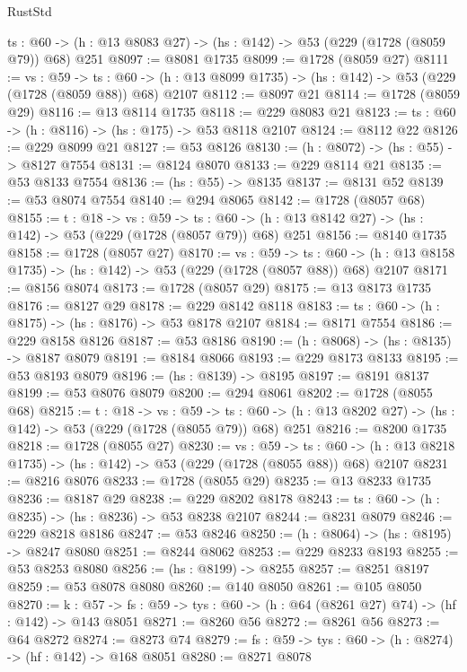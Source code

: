 \begin{lexlean}{RustStd}
\begin{coremodule}
  {ts : @60} -> (h : @13 @8083 @27) -> (hs : @142) -> @53 (@229 (@1728 (@8059 @79)) @68) @251
@8097 := @8081 @1735
@8099 := @1728 (@8059 @27)
@8111 := {vs : @59} ->
  {ts : @60} -> (h : @13 @8099 @1735) -> (hs : @142) -> @53 (@229 (@1728 (@8059 @88)) @68) @2107
@8112 := @8097 @21
@8114 := @1728 (@8059 @29)
@8116 := @13 @8114 @1735
@8118 := @229 @8083 @21
@8123 := {ts : @60} -> (h : @8116) -> (hs : @175) -> @53 @8118 @2107
@8124 := @8112 @22
@8126 := @229 @8099 @21
@8127 := @53 @8126
@8130 := (h : @8072) -> (hs : @55) -> @8127 @7554
@8131 := @8124 @8070
@8133 := @229 @8114 @21
@8135 := @53 @8133 @7554
@8136 := (hs : @55) -> @8135
@8137 := @8131 @52
@8139 := @53 @8074 @7554
@8140 := @294 @8065
@8142 := @1728 (@8057 @68)
@8155 := {t : @18} ->
  {vs : @59} ->
  {ts : @60} -> (h : @13 @8142 @27) -> (hs : @142) -> @53 (@229 (@1728 (@8057 @79)) @68) @251
@8156 := @8140 @1735
@8158 := @1728 (@8057 @27)
@8170 := {vs : @59} ->
  {ts : @60} -> (h : @13 @8158 @1735) -> (hs : @142) -> @53 (@229 (@1728 (@8057 @88)) @68) @2107
@8171 := @8156 @8074
@8173 := @1728 (@8057 @29)
@8175 := @13 @8173 @1735
@8176 := @8127 @29
@8178 := @229 @8142 @8118
@8183 := {ts : @60} -> (h : @8175) -> (hs : @8176) -> @53 @8178 @2107
@8184 := @8171 @7554
@8186 := @229 @8158 @8126
@8187 := @53 @8186
@8190 := (h : @8068) -> (hs : @8135) -> @8187 @8079
@8191 := @8184 @8066
@8193 := @229 @8173 @8133
@8195 := @53 @8193 @8079
@8196 := (hs : @8139) -> @8195
@8197 := @8191 @8137
@8199 := @53 @8076 @8079
@8200 := @294 @8061
@8202 := @1728 (@8055 @68)
@8215 := {t : @18} ->
  {vs : @59} ->
  {ts : @60} -> (h : @13 @8202 @27) -> (hs : @142) -> @53 (@229 (@1728 (@8055 @79)) @68) @251
@8216 := @8200 @1735
@8218 := @1728 (@8055 @27)
@8230 := {vs : @59} ->
  {ts : @60} -> (h : @13 @8218 @1735) -> (hs : @142) -> @53 (@229 (@1728 (@8055 @88)) @68) @2107
@8231 := @8216 @8076
@8233 := @1728 (@8055 @29)
@8235 := @13 @8233 @1735
@8236 := @8187 @29
@8238 := @229 @8202 @8178
@8243 := {ts : @60} -> (h : @8235) -> (hs : @8236) -> @53 @8238 @2107
@8244 := @8231 @8079
@8246 := @229 @8218 @8186
@8247 := @53 @8246
@8250 := (h : @8064) -> (hs : @8195) -> @8247 @8080
@8251 := @8244 @8062
@8253 := @229 @8233 @8193
@8255 := @53 @8253 @8080
@8256 := (hs : @8199) -> @8255
@8257 := @8251 @8197
@8259 := @53 @8078 @8080
@8260 := @140 @8050
@8261 := @105 @8050
@8270 := {k : @57} ->
  {fs : @59} -> {tys : @60} -> (h : @64 (@8261 @27) @74) -> (hf : @142) -> @143 @8051
@8271 := @8260 @56
@8272 := @8261 @56
@8273 := @64 @8272
@8274 := @8273 @74
@8279 := {fs : @59} -> {tys : @60} -> (h : @8274) -> (hf : @142) -> @168 @8051
@8280 := @8271 @8078

\end{coremodule}
\end{lexlean}
